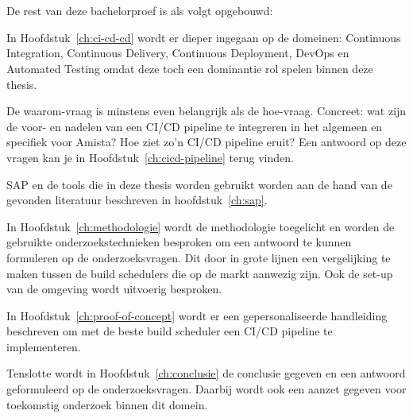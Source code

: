 \section{}
\label{sec:opzet-bachelorproef}


De rest van deze bachelorproef is als volgt opgebouwd:

In Hoofdstuk~\ref{ch:ci-cd-cd} wordt er dieper ingegaan op de domeinen: Continuous Integration, Continuous Delivery, Continuous Deployment, DevOps en Automated Testing omdat deze toch een dominantie rol spelen binnen deze thesis.

De waarom-vraag is minstens even belangrijk als de hoe-vraag. Concreet: wat zijn de voor- en nadelen van een CI/CD pipeline te integreren in het algemeen en specifiek voor Amista? Hoe ziet zo'n CI/CD pipeline eruit? Een antwoord op deze vragen kan je in Hoofdstuk~\ref{ch:cicd-pipeline} terug vinden.

SAP en de tools die in deze thesis worden gebruikt worden aan de hand van de gevonden literatuur beschreven in hoofdstuk~\ref{ch:sap}.

In Hoofdstuk~\ref{ch:methodologie} wordt de methodologie toegelicht en worden de gebruikte onderzoekstechnieken besproken om een antwoord te kunnen formuleren op de onderzoeksvragen. Dit door in grote lijnen een vergelijking te maken tussen de build schedulers die op de markt aanwezig zijn. Ook de set-up van de omgeving wordt uitvoerig besproken.

In Hoofdstuk~\ref{ch:proof-of-concept} wordt er een gepersonaliseerde handleiding beschreven om met de beste build scheduler een CI/CD pipeline te implementeren.

Tenslotte wordt in Hoofdstuk~\ref{ch:conclusie} de conclusie gegeven en een antwoord geformuleerd op de onderzoeksvragen. Daarbij wordt ook een aanzet gegeven voor toekomstig onderzoek binnen dit domein.